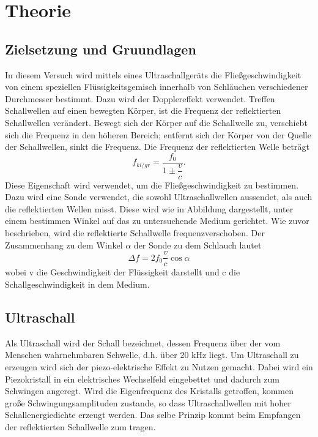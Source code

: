 \section{Theorie}
\label{sec:Theorie}

\subsection{Zielsetzung und Gruundlagen}
    In diesem Versuch wird mittels eines Ultraschallgeräts die Fließgeschwindigkeit von einem 
    speziellen Flüssigkeitsgemisch innerhalb von Schläuchen verschiedener Durchmesser
    bestimmt. Dazu wird der Dopplereffekt verwendet. Treffen Schallwellen auf einen bewegten Körper,
    ist die Frequenz der reflektierten Schallwellen verändert. Bewegt sich der Körper auf die 
    Schallwelle zu, verschiebt sich die Frequenz in den höheren Bereich; entfernt sich der Körper
    von der Quelle der Schallwellen, sinkt die Frequenz. Die Frequenz der reflektierten Welle 
    beträgt
    \begin{equation}
        f_{kl/gr}=\dfrac{f_0}{1\pm \dfrac{v}{c}}.
    \end{equation}
    Diese Eigenschaft wird verwendet, um die Fließgeschwindigkeit zu bestimmen. Dazu wird eine 
    Sonde verwendet, die sowohl Ultraschallwellen aussendet, als auch die reflektierten Wellen 
    misst. Diese wird wie in Abbildung dargestellt, unter einem bestimmen Winkel auf das zu 
    untersuchende Medium gerichtet. Wie zuvor beschrieben, wird die reflektierte Schallwelle
    frequenzverschoben. Der Zusammenhang zu dem Winkel $\alpha$ der Sonde zu dem Schlauch 
    lautet
    \begin{equation}
        \Delta f = 2 f_0 \dfrac{v}{c} \cos{\alpha}
    \end{equation}
    wobei v die Geschwindigkeit der Flüssigkeit darstellt und c die Schallgeschwindigkeit in 
    dem Medium.

\subsection{Ultraschall}
    Als Ultraschall wird der Schall bezeichnet, dessen Frequenz über der vom Menschen wahrnehmbaren 
    Schwelle, d.h. über 20 kHz liegt. Um Ultraschall zu erzeugen wird sich der piezo-elektrische
    Effekt zu Nutzen gemacht. Dabei wird ein Piezokristall in ein elektrisches Wechselfeld eingebettet
    und dadurch zum Schwingen angeregt. Wird die Eigenfrequenz des Kristalls getroffen, kommen
    große Schwingungsamplituden zustande, so dass Ultraschallwellen mit hoher Schallenergiedichte 
    erzeugt werden. Das selbe Prinzip kommt beim Empfangen der reflektierten Schallwelle zum 
    tragen.
